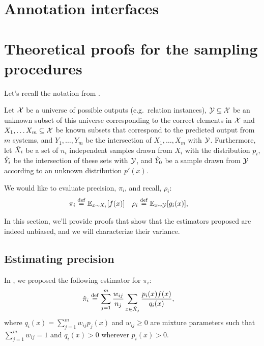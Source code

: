 \onecolumn
\section{Annotation interfaces}
\label{sec:interface}

\section{Theoretical proofs for the sampling procedures}
\label{app:sampling}

Let's recall the notation from .

Let $\mathcal{X}$ be a universe of possible outputs (e.g.\ relation instances),
  $\mathcal{Y} \subseteq \mathcal{X}$ be an unknown subset of this universe corresponding to the correct elements in $\mathcal{X}$ and
  $X_1, \ldots X_m \subseteq \mathcal{X}$ be known subsets that correspond to the predicted output from $m$ systems,
  and $Y_1, \ldots, Y_m$ be the intersection of $X_1, \ldots, X_m$ with $\mathcal{Y}$.
Furthermore, 
  let ${\hat{X}}_i$ be a set of $n_i$ independent samples drawn from $X_i$ with the distribution $p_i$,
  ${\hat{Y}}_i$ be the intersection of these sets with $\mathcal{Y}$, and
  ${\hat{Y}}_0$ be a sample drawn from $\mathcal{Y}$ according to an unknown distribution $p'(x)$.

We would like to evaluate precision, $\pi_i$, and recall, $\rho_i$:
\begin{align*}
  \pi_i  &\stackrel{\rm def}{=} \mathbb{E}_{x \sim X_i}[f(x)] &
  \rho_i &\stackrel{\rm def}{=} \mathbb{E}_{x \sim \mathcal{Y}}[g_i(x)],
\end{align*}

In this section, we'll provide proofs that show that the estimators proposed are indeed unbiased, and we will characterize their variance.

\subsection{Estimating precision}

In , we proposed the following estimator for $\pi_i$:
\begin{align*}
  {\hat{\pi}}_i &\stackrel{\rm def}{=} \sum_{j=1}^m \frac{w_{ij}}{n_j} \sum_{x \in {\hat{X}}_j} \frac{p_i(x) f(x)}{q_i(x)},
\end{align*}
where $q_i(x) = \sum_{j=1}^m w_{ij} p_j(x)$ and $w_{ij} \ge 0$ are mixture parameters such that $\sum_{j=1}^m w_{ij} = 1$ and $q_i(x) > 0$ wherever $p_i(x) > 0$.

